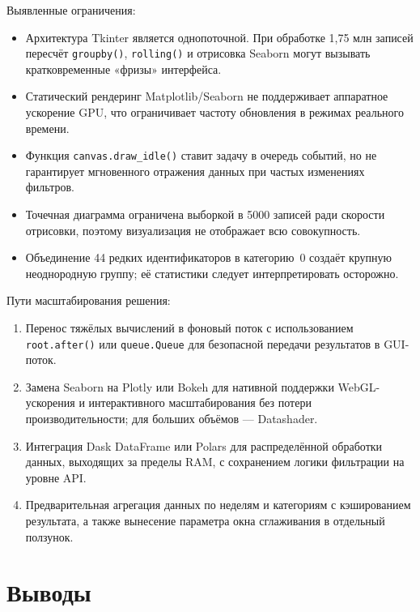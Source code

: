 \documentclass[oneside,a4paper,14pt]{extarticle}
\begin{document}
Выявленные ограничения:
\begin{itemize}[leftmargin=*]
	\item Архитектура Tkinter является однопоточной. При обработке 1,75 млн записей пересчёт \texttt{groupby()}, \texttt{rolling()} и отрисовка Seaborn могут вызывать кратковременные «фризы» интерфейса.
	\item Статический рендеринг Matplotlib/Seaborn не поддерживает аппаратное ускорение GPU, что ограничивает частоту обновления в режимах реального времени.
	\item Функция \texttt{canvas.draw\_idle()} ставит задачу в очередь событий, но не гарантирует мгновенного отражения данных при частых изменениях фильтров.
	\item Точечная диаграмма ограничена выборкой в 5000 записей ради скорости отрисовки, поэтому визуализация не отображает всю совокупность.
	\item Объединение 44 редких идентификаторов в категорию~0 создаёт крупную неоднородную группу; её статистики следует интерпретировать осторожно.
\end{itemize}

Пути масштабирования решения:
\begin{enumerate}[leftmargin=*]
	\item Перенос тяжёлых вычислений в фоновый поток с использованием \texttt{root.after()} или \texttt{queue.Queue} для безопасной передачи результатов в GUI-поток.
	\item Замена Seaborn на Plotly или Bokeh для нативной поддержки WebGL-ускорения и интерактивного масштабирования без потери производительности; для больших объёмов --- Datashader.
	\item Интеграция Dask DataFrame или Polars для распределённой обработки данных, выходящих за пределы RAM, с сохранением логики фильтрации на уровне API.
	\item Предварительная агрегация данных по неделям и категориям с кэшированием результата, а также вынесение параметра окна сглаживания в отдельный ползунок.
\end{enumerate}

\section{Выводы}
\end{document}
